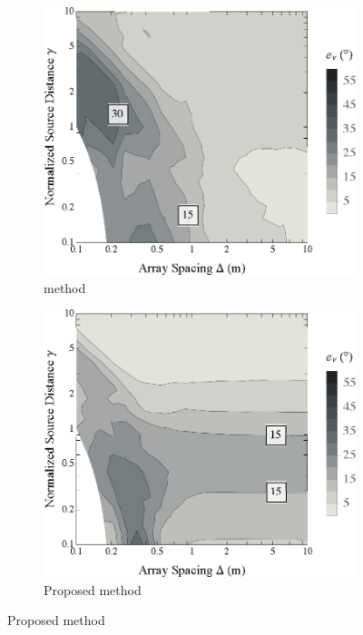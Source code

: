 \begin{figure}[t]
	\centering
	\begin{subfigure}[b]{0.49\textwidth}
		\includegraphics[width=\textwidth]{09_thiergart_comparison/figures/tylka2017_contour_thiergart.eps}
		\caption{\citet{Thiergart2013} method}
		\label{fig:09_Thiergart_Comparison:Localization_Errors:Thiergart}
	\end{subfigure}
	\hfill
	\begin{subfigure}[b]{0.49\textwidth}
		\includegraphics[width=\textwidth]{08_proposed_method/figures/tylka2017_contour_validhybrid.eps}
		\caption{Proposed method}
		\label{fig:09_Thiergart_Comparison:Localization_Errors:Hybrid}
	\end{subfigure}
	

\end{figure}
